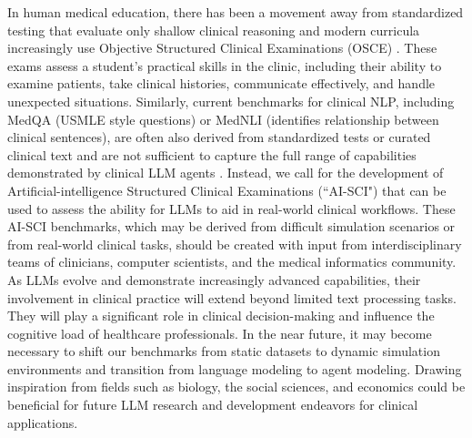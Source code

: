 \documentclass[10pt]{article}
\begin{document}
\begin{multicols}{2}
In human medical education, there has been a movement away from standardized testing that evaluate only shallow clinical reasoning and modern curricula increasingly use Objective Structured Clinical Examinations (OSCE) \cite{zayyan2011objective}. These exams assess a student’s practical skills in the clinic, including their ability to examine patients, take clinical histories, communicate effectively, and handle unexpected situations. Similarly, current benchmarks for clinical NLP, including MedQA (USMLE style questions) or MedNLI (identifies relationship between clinical sentences), are often also derived from standardized tests or curated clinical text and are not sufficient to capture the full range of capabilities demonstrated by clinical LLM agents \cite{lehman2023clinical,singhal2022large}. Instead, we call for the development of Artificial-intelligence Structured Clinical Examinations (“AI-SCI") that can be used to assess the ability for LLMs to aid in real-world clinical workflows. These AI-SCI benchmarks, which may be derived from difficult simulation scenarios or from real-world clinical tasks, should be created with input from interdisciplinary teams of clinicians, computer scientists, and the medical informatics community. As LLMs evolve and demonstrate increasingly advanced capabilities, their involvement in clinical practice will extend beyond limited text processing tasks. They will play a significant role in clinical decision-making and influence the cognitive load of healthcare professionals. In the near future, it may become necessary to shift our benchmarks from static datasets to dynamic simulation environments and transition from language modeling to agent modeling. Drawing inspiration from fields such as biology, the social sciences, and economics could be beneficial for future LLM research and development endeavors for clinical applications.
\end{multicols}



\end{document}
